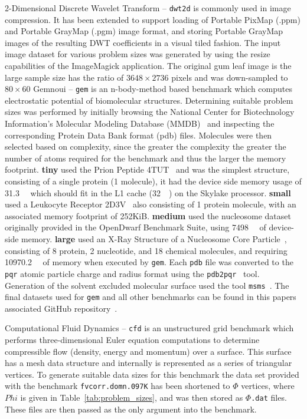 \documentclass[../document.tex]{subfiles}
\begin{document}
2-Dimensional Discrete Wavelet Transform -- {\tt dwt2d} is commonly used in image compression.
It has been extended to support loading of Portable PixMap (.ppm) and Portable GrayMap (.pgm) image format, and storing Portable GrayMap images of the resulting DWT coefficients in a visual tiled fashion.
The input image dataset for various problem sizes was generated by using the resize capabilities of the ImageMagick application.
The original gum leaf image is the large sample size has the ratio of $3648 \times 2736$ pixels and was down-sampled to  $80 \times 60$ 
Gemnoui -- {\tt gem} is an n-body-method based benchmark which computes electrostatic potential of biomolecular structures.
Determining suitable problem sizes was performed by initially browsing the National Center for Biotechnology Information's Molecular Modeling Database (MMDB)~\cite{madej2013mmdb} and inspecting the corresponding Protein Data Bank format (pdb) files.
Molecules were then selected based on complexity, since the greater the complexity the greater the number of atoms required for the benchmark and thus the larger the memory footprint.
{\bf tiny} used the Prion Peptide 4TUT~\cite{yu2015crystal} and was the simplest structure, consisting of a single protein (1 molecule), it had the device side memory usage of \SI{31.3}{\kibi\byte} which should fit in the L1 cache (\SI{32}{\kibi\byte}) on the Skylake processor.
{\bf small} used a Leukocyte Receptor 2D3V~\cite{shiroishi2006crystal} also consisting of 1 protein molecule, with an associated memory footprint of 252KiB.
{\bf medium} used the nucleosome dataset originally provided in the OpenDwarf Benchmark Suite, using \SI{7498}{\kibi\byte} of device-side memory.
{\bf large} used an X-Ray Structure of a Nucleosome Core Particle~\cite{davey2002solvent}, consisting of 8 protein, 2 nucleotide, and 18 chemical molecules, and requiring \SI{10970.2}{\kibi\byte} of memory when executed by {\tt gem}.
Each {\tt pdb} file was converted to the {\tt pqr} atomic particle charge and radius format using the {\tt pdb2pqr}~\cite{dolinsky2004pdb2pqr} tool.
Generation of the solvent excluded molecular surface used the tool {\tt msms}~\cite{sanner1996reduced}.
The final datasets used for {\tt gem} and all other benchmarks can be found in this papers associated GitHub repository~\cite{johnston2017}.

Computational Fluid Dynamics -- {\tt cfd} is an unstructured grid benchmark which performs three-dimensional Euler equation computations to determine compressible flow (density, energy and momentum) over a surface.
This surface has a mesh data structure and internally is represented as a series of triangular vertices.
To generate suitable data sizes for this benchmark the data set provided with the benchmark {\tt fvcorr.domn.097K} has been shortened to $\Phi$ vertices, where $Phi$ is given in Table~\ref{tab:problem_sizes}, and was then stored as $\Phi${\tt.dat} files.
These files are then passed as the only argument into the benchmark.
\end{document}

